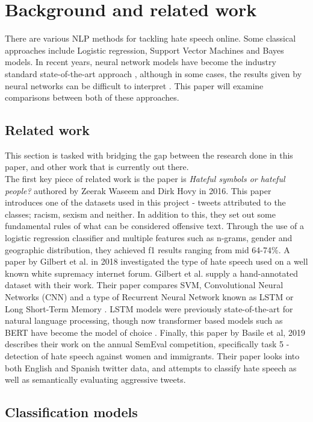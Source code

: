 \documentclass[conference]{IEEEtran}
\begin{document}
\section{Background and related work}
There are various NLP methods for tackling hate speech online. Some classical approaches include Logistic regression, Support Vector Machines and Bayes models. In recent years, neural network models have become the industry standard state-of-the-art approach \cite{19}, although in some cases, the results given by neural networks can be difficult to interpret \cite{10}. This paper will examine comparisons between both of these approaches.

\subsection{Related work}
This section is tasked with bridging the gap between the research done in this paper, and other work that is currently out there.\\

The first key piece of related work is the paper is \textit{Hateful symbols or hateful people?} authored by Zeerak Waseem and Dirk Hovy in 2016. This paper introduces one of the datasets used in this project - tweets attributed to the classes; racism, sexism and neither. In addition to this, they set out some fundamental rules of what can be considered offensive text. Through the use of a logistic regression classifier and multiple features such as n-grams, gender and geographic distribution, they achieved f1 results ranging from mid 64-74\%\cite{16}.
A paper by Gilbert et al. in 2018 investigated the type of hate speech used on a well known white supremacy internet forum. Gilbert et al. supply a hand-annotated dataset with their work. Their paper compares SVM, Convolutional Neural Networks (CNN) and a type of Recurrent Neural Network known as LSTM or Long Short-Term Memory \cite{7}. LSTM models were previously state-of-the-art for natural language processing, though now transformer based models such as BERT have become the model of choice \cite{17}.
Finally, this paper by Basile et al, 2019 describes their work on the annual SemEval competition, specifically task 5 - detection of hate speech against women and immigrants\cite{3}. Their paper looks into both English and Spanish twitter data, and attempts to classify hate speech as well as semantically evaluating aggressive tweets.

\subsection{Classification models}
\end{document}
